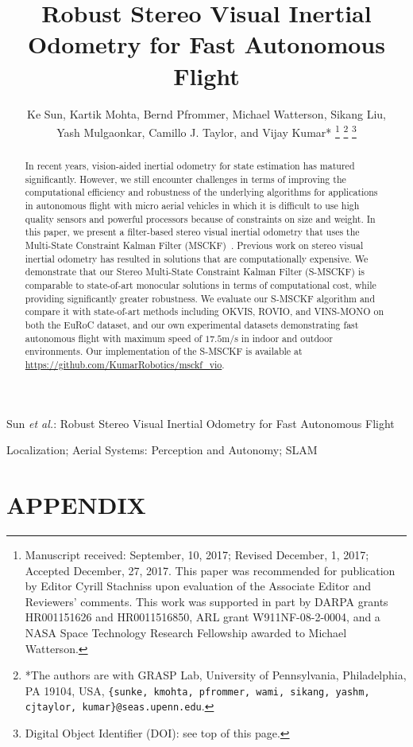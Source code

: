 \documentclass[letterpaper, 10 pt, journal, twoside]{IEEEtran}
\title{
Robust Stereo Visual Inertial Odometry for Fast Autonomous Flight
}
\author{Ke Sun, Kartik Mohta, Bernd Pfrommer, Michael Watterson, Sikang Liu, \\
Yash Mulgaonkar, Camillo J. Taylor, and Vijay Kumar*
\thanks{Manuscript received: September, 10, 2017; Revised December, 1, 2017; Accepted December, 27, 2017. This paper was recommended for publication by Editor Cyrill Stachniss upon evaluation of the Associate Editor and Reviewers' comments. This work was supported in part by DARPA grants HR001151626 and HR0011516850, ARL grant W911NF-08-2-0004, and a NASA Space Technology Research Fellowship awarded to Michael Watterson.}%
\thanks{*The authors are with GRASP Lab, University of Pennsylvania, Philadelphia, PA 19104, USA, {\tt\small\{sunke, kmohta, pfrommer, wami, sikang, yashm, cjtaylor, kumar\}@seas.upenn.edu}.}
\thanks{Digital Object Identifier (DOI): see top of this page.}
}
\begin{document}
\maketitle
{Sun \MakeLowercase{\textit{et al.}}: Robust Stereo Visual Inertial Odometry for Fast Autonomous Flight}  



\begin{abstract}
In recent years, vision-aided inertial odometry for state estimation has matured significantly. However, we still encounter challenges in terms of improving the computational efficiency and robustness of the underlying algorithms for applications in autonomous flight with micro aerial vehicles in which it is difficult to use high quality sensors and powerful processors because of constraints on size and weight. In this paper, we present a filter-based stereo visual inertial odometry that uses the Multi-State Constraint Kalman Filter (MSCKF)~\cite{mourikis2007multi}. Previous work on stereo visual inertial odometry has resulted in solutions that are computationally expensive. We demonstrate that our Stereo Multi-State Constraint Kalman Filter (S-MSCKF) is comparable to state-of-art monocular solutions in terms of computational cost, while providing significantly greater robustness. We evaluate our S-MSCKF algorithm and compare it with state-of-art methods including OKVIS, ROVIO, and VINS-MONO on both the EuRoC dataset, and our own experimental datasets demonstrating fast autonomous flight with maximum speed of $17.5$m/s in indoor and outdoor environments. Our implementation of the S-MSCKF is available at \url{https://github.com/KumarRobotics/msckf_vio}.
\end{abstract}
\begin{IEEEkeywords}
Localization; Aerial Systems: Perception and Autonomy; SLAM
\end{IEEEkeywords}











\section*{APPENDIX}
\appendices







\end{document}
